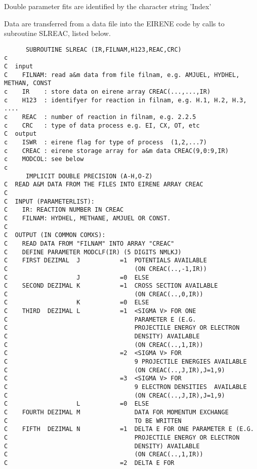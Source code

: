 \documentclass[12pt]{article}
\begin{document}
Double parameter fits are identified by the character string
'Index'

Data are transferred from a data file into the EIRENE code by
calls to subroutine SLREAC, listed below.

\begin{small}\begin{verbatim}
      SUBROUTINE SLREAC (IR,FILNAM,H123,REAC,CRC)
c
C  input
C    FILNAM: read a&m data from file filnam, e.g. AMJUEL, HYDHEL, METHAN, CONST
c    IR    : store data on eirene array CREAC(...,...,IR)
c    H123  : identifyer for reaction in filnam, e.g. H.1, H.2, H.3, ....
c    REAC  : number of reaction in filnam, e.g. 2.2.5
c    CRC   : type of data process e.g. EI, CX, OT, etc
C  output
c    ISWR  : eirene flag for type of process  (1,2,...7)
c    CREAC : eirene storage array for a&m data CREAC(9,0:9,IR)
c    MODCOL: see below
c
      IMPLICIT DOUBLE PRECISION (A-H,O-Z)
C  READ A&M DATA FROM THE FILES INTO EIRENE ARRAY CREAC
C
C  INPUT (PARAMETERLIST):
C    IR: REACTION NUMBER IN CREAC
C    FILNAM: HYDHEL, METHANE, AMJUEL OR CONST.
C
C  OUTPUT (IN COMMON COMXS):
C    READ DATA FROM "FILNAM" INTO ARRAY "CREAC"
C    DEFINE PARAMETER MODCLF(IR) (5 DIGITS NMLKJ)
C    FIRST DEZIMAL  J           =1  POTENTIALS AVAILABLE
C                                   (ON CREAC(..,-1,IR))
C                   J           =0  ELSE
C    SECOND DEZIMAL K           =1  CROSS SECTION AVAILABLE
C                                   (ON CREAC(..,0,IR))
C                   K           =0  ELSE
C    THIRD  DEZIMAL L           =1  <SIGMA V> FOR ONE
C                                   PARAMETER E (E.G.
C                                   PROJECTILE ENERGY OR ELECTRON
C                                   DENSITY) AVAILABLE
C                                   (ON CREAC(..,1,IR))
C                               =2  <SIGMA V> FOR
C                                   9 PROJECTILE ENERGIES AVAILABLE
C                                   (ON CREAC(..,J,IR),J=1,9)
C                               =3  <SIGMA V> FOR
C                                   9 ELECTRON DENSITIES  AVAILABLE
C                                   (ON CREAC(..,J,IR),J=1,9)
C                   L           =0  ELSE
C    FOURTH DEZIMAL M               DATA FOR MOMENTUM EXCHANGE
C                                   TO BE WRITTEN
C    FIFTH  DEZIMAL N           =1  DELTA E FOR ONE PARAMETER E (E.G.
C                                   PROJECTILE ENERGY OR ELECTRON
C                                   DENSITY) AVAILABLE
C                                   (ON CREAC(..,1,IR))
C                               =2  DELTA E FOR

\end{verbatim}
\end{small}
\end{document}
